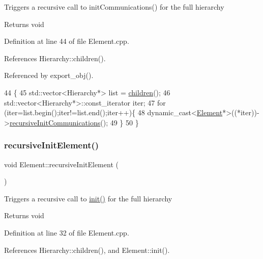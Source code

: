 Triggers a recursive call to init\+Communications() for the full hierarchy

\begin{DoxyReturn}{Returns}
void 
\end{DoxyReturn}


Definition at line 44 of file Element.\+cpp.



References Hierarchy\+::children().



Referenced by export\+\_\+obj().


\begin{DoxyCode}
44                                          \{
45   std::vector<Hierarchy*> list = \hyperlink{classHierarchy_aa9a76f69e98e052ee1a6e32cea006288}{children}();
46   std::vector<Hierarchy*>::const\_iterator iter;
47   \textcolor{keywordflow}{for} (iter=list.begin();iter!=list.end();iter++)\{
48     \textcolor{keyword}{dynamic\_cast<}\hyperlink{classElement}{Element}*\textcolor{keyword}{>}((*iter))->\hyperlink{classElement_a82119ed37dff76508a2746a853ec35ba}{recursiveInitCommunications}();
49   \}
50 \}
\end{DoxyCode}
\mbox{\label{classElement_a3c0abcb36f8906688bb7e32608df7086}} 
\subsubsection{\texorpdfstring{recursive\+Init\+Element()}{recursiveInitElement()}}
{\footnotesize\ttfamily void Element\+::recursive\+Init\+Element (\begin{DoxyParamCaption}{ }\end{DoxyParamCaption})\hspace{0.3cm}{\ttfamily [inherited]}}

Triggers a recursive call to \hyperlink{classFEB__v1_a70d7d266c7d05fdfab21d5b0293f1ad8}{init()} for the full hierarchy

\begin{DoxyReturn}{Returns}
void 
\end{DoxyReturn}


Definition at line 32 of file Element.\+cpp.



References Hierarchy\+::children(), and Element\+::init().



